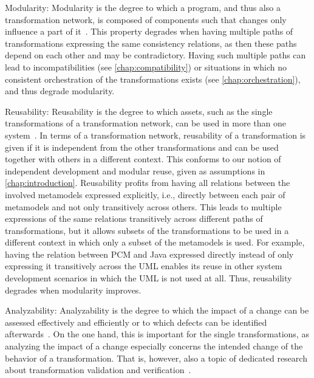 \begin{properdescription}
    \item[Modularity:] 
    Modularity is the degree to which a program, and thus also a transformation network, is composed of components such that changes only influence a part of it~\cite[p.~14]{iso25010}.
    This property degrades when having multiple paths of transformations expressing the same consistency relations, as then these paths depend on each other and may be contradictory. 
    Having such multiple paths can lead to incompatibilities (see \autoref{chap:compatibility}) or situations in which no consistent orchestration of the transformations exists (see \autoref{chap:orchestration}), and thus degrade modularity.
    \item[Reusability:]
    Reusability is the degree to which assets, such as the single transformations of a transformation network, can be used in more than one system~\cite[p.~15]{iso25010}.
    In terms of a transformation network, reusability of a transformation is given if it is independent from the other transformations and can be used together with others in a different context.
    This conforms to our notion of independent development and modular reuse, given as assumptions in \autoref{chap:introduction}.
    Reusability profits from having all relations between the involved metamodels expressed explicitly, i.e., directly between each pair of metamodels and not only transitively across others.
    This leads to multiple expressions of the same relations transitively across different paths of transformations, but it allows subsets of the transformations to be used in a different context in which only a subset of the metamodels is used.
    For example, having the relation between \gls{PCM} and Java expressed directly instead of only expressing it transitively across the \gls{UML} enables its reuse in other system development scenarios in which the \gls{UML} is not used at all.
    Thus, reusability degrades when modularity improves.
    \item[Analyzability:] 
    Analyzability is the degree to which the impact of a change can be assessed effectively and efficiently or to which defects can be identified afterwards~\cite[p.~15]{iso25010}.
    On the one hand, this is important for the single transformations, as analyzing the impact of a change especially concerns the intended change of the behavior of a transformation. That is, however, also a topic of dedicated research about transformation validation and verification~\cite{cabot2010VerificationInvariants-JSS, rahim2015SurveyTransformationVerification-SoSym, azizi2017ContractVerification-ICCKE, vallecillo2012FormalTesting-FMMDE}.

\end{properdescription}
